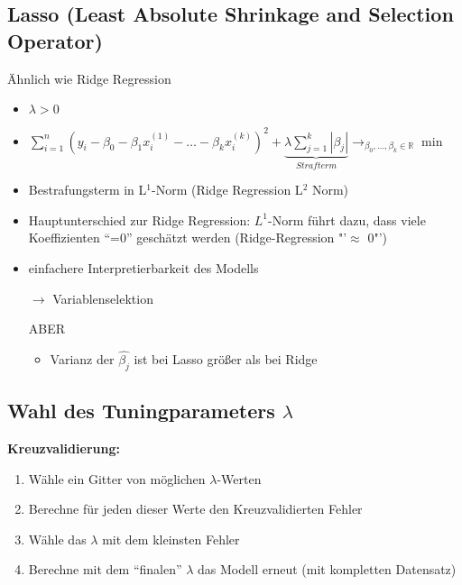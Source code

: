 \subsection{Lasso (Least Absolute Shrinkage and Selection Operator)}
Ähnlich wie Ridge Regression 
\begin{itemize}
	\item \(\lambda > 0 \)
	\item \(\sum_{i = 1}^{n}(y_i -\beta_0 - \beta_1 x_i^{(1)} - \ldots - \beta_k x_i^{(k)})^2 + \underbrace{\lambda \sum_{j = 1}^{k}|\beta_j|}_{Strafterm}
	\rightarrow_{\beta_0, \ldots, \beta_k \in \mathbb{R}} \min \)
	\item Bestrafungsterm in L$^1$-Norm (Ridge Regression L$^2$ Norm)
	\item Hauptunterschied zur Ridge Regression: $L^1$-Norm führt dazu, dass viele Koeffizienten "`=0"' geschätzt werden (Ridge-Regression "'$\approx$ 0"')
	\item einfachere Interpretierbarkeit des Modells
	\item [\(\rightarrow\)] Variablenselektion
	\item [ABER]
	\begin{itemize}
		\item Varianz der $ \hat{\beta_j} $ ist bei Lasso größer als bei Ridge
	\end{itemize}
\end{itemize}


\subsection{Wahl des Tuningparameters $\lambda$}
\textbf{Kreuzvalidierung:}
\begin{enumerate}
	\item Wähle ein Gitter von möglichen $\lambda$-Werten
	\item Berechne für jeden dieser Werte den Kreuzvalidierten Fehler
	\item Wähle das \(\lambda\) mit dem kleinsten Fehler
	\item Berechne mit dem "`finalen"' \( \lambda \) das Modell erneut (mit kompletten Datensatz)
\end{enumerate}


